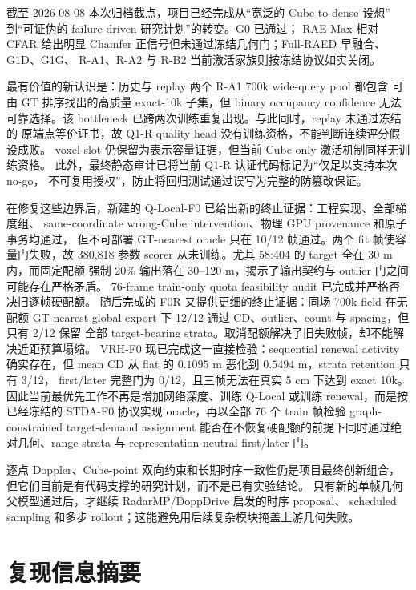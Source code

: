 \documentclass[11pt,a4paper,fontset=none]{ctexart}
\begin{document}
截至 2026-08-08 本次归档截点，项目已经完成从“宽泛的 Cube-to-dense 设想”
到“可证伪的 failure-driven 研究计划”的转变。G0 已通过；
RAE-Max 相对 CFAR 给出明显 Chamfer 正信号但未通过冻结几何门；Full-RAED 早融合、G1D、G1G、
R-A1、R-A2 与 R-B2 当前激活家族则按冻结协议如实关闭。

最有价值的新认识是：历史与 replay 两个 R-A1 700k wide-query pool 都包含
可由 GT 排序找出的高质量 exact-10k 子集，但 binary occupancy confidence 无法
可靠选择。该 bottleneck 已跨两次训练重复出现。与此同时，replay 未通过冻结的
原端点等价证书，故 Q1-R quality head 没有训练资格，不能判断连续评分假设成败。
voxel-slot 仍保留为表示容量证据，但当前 Cube-only 激活机制同样无训练资格。
此外，最终静态审计已将当前 Q1-R 认证代码标记为“仅足以支持本次 no-go，
不可复用授权”，防止将回归测试通过误写为完整的防篡改保证。

在修复这些边界后，新建的 Q-Local-F0 已给出新的终止证据：工程实现、全部梯度组、
same-coordinate wrong-Cube intervention、物理 GPU provenance 和原子事务均通过，
但不可部署 GT-nearest oracle 只在 10/12 帧通过。两个 fit 帧使容量门失败，故
380,818 参数 scorer 从未训练。尤其 58:404 的 target 全在 30 m 内，而固定配额
强制 20\% 输出落在 30--120 m，揭示了输出契约与 outlier 门之间可能存在严格矛盾。
76-frame train-only quota feasibility audit 已完成并严格否决旧逐帧硬配额。
随后完成的 F0R 又提供更细的终止证据：同场 700k field 在无配额 GT-nearest
global export 下 12/12 通过 CD、outlier、count 与 spacing，但只有 2/12 保留
全部 target-bearing strata。取消配额解决了旧失败帧，却不能解决近距预算塌缩。
VRH-F0 现已完成这一直接检验：sequential renewal activity 确实存在，但
mean CD 从 flat 的 $0.1095$ m 恶化到 $0.5494$ m，strata retention 只有 3/12，
first/later 完整门为 0/12，且三帧无法在真实 5 cm 下达到 exact 10k。
因此当前最优先工作不再是增加网络深度、训练 Q-Local 或训练 renewal，而是按
已经冻结的 STDA-F0 协议实现 oracle，再以全部 76 个 train 帧检验 graph-constrained
target-demand assignment 能否在不恢复硬配额的前提下同时通过绝对几何、range
strata 与 representation-neutral first/later 门。

逐点 Doppler、Cube-point 双向约束和长期时序一致性仍是项目最终创新组合，
但它们目前是有代码支撑的研究计划，而不是已有实验结论。
只有新的单帧几何父模型通过后，才继续 RadarMP/DoppDrive 启发的时序 proposal、
scheduled sampling 和多步 rollout；这能避免用后续复杂模块掩盖上游几何失败。

\appendix
\section{复现信息摘要}
\end{document}
